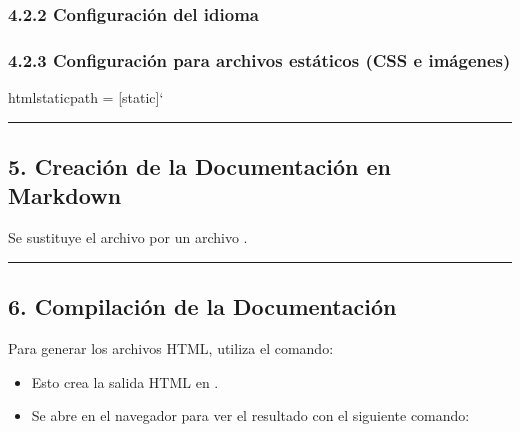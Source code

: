 \documentclass[a4paper,10pt,spanish]{sphinxmanual}
\begin{document}
\subsubsection{4.2.2 Configuración del idioma}
\label{\detokenize{configuracion_inicial/003.Creacion_proyecto_Sphinx:configuracion-del-idioma}}
\begin{sphinxVerbatim}[commandchars=\\\{\}]
    
\end{sphinxVerbatim}


\subsubsection{4.2.3 Configuración para archivos estáticos (CSS e imágenes)}
\label{\detokenize{configuracion_inicial/003.Creacion_proyecto_Sphinx:configuracion-para-archivos-estaticos-css-e-imagenes}}
\begin{sphinxVerbatim}[commandchars=\\\{\}]
html\PYGZus{}static\PYGZus{}path = [\PYGZsq{}\PYGZus{}static\PYGZsq{}]` 
\end{sphinxVerbatim}


\bigskip\hrule\bigskip



\subsection{5. Creación de la Documentación en Markdown}
\label{\detokenize{configuracion_inicial/003.Creacion_proyecto_Sphinx:creacion-de-la-documentacion-en-markdown}}
\sphinxAtStartPar
Se sustituye el archivo  por un archivo .


\bigskip\hrule\bigskip



\subsection{6. Compilación de la Documentación}
\label{\detokenize{configuracion_inicial/003.Creacion_proyecto_Sphinx:compilacion-de-la-documentacion}}
\sphinxAtStartPar
Para generar los archivos HTML, utiliza el comando:

\begin{sphinxVerbatim}[commandchars=\\\{\}]
 
\end{sphinxVerbatim}
\begin{itemize}
\item {} 
\sphinxAtStartPar
Esto crea la salida HTML en .

\item {} 
\sphinxAtStartPar
Se abre  en el navegador para ver el resultado con el siguiente comando:

\end{itemize}
\end{document}
